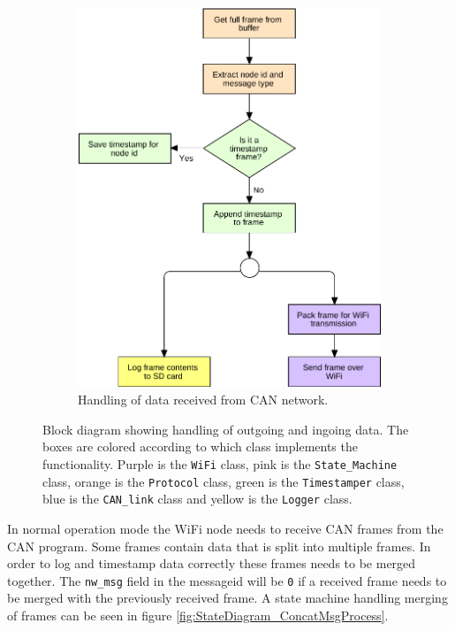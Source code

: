 \begin{figure}[!h]
\begin{subfigure}[b]{0.52\textwidth}
\includegraphics[width=1\textwidth]{graphics/FlowChart_CANFrameProcess}
\caption{Handling of data received from CAN network.}
\label{fig:FlowChart_CANFrameProcess}
\end{subfigure}
\caption[Block diagram showing handling of outgoing and ingoing data.]{Block diagram showing handling of outgoing and ingoing data. The boxes are colored according to which class implements the functionality. Purple is the \texttt{WiFi} class, pink is the \texttt{State\_Machine} class, orange is the \texttt{Protocol} class, green is the \texttt{Timestamper} class, blue is the \texttt{CAN\_link} class and yellow is the \texttt{Logger} class.}
\label{fig:wifi_flow}
\end{figure}

In normal operation mode the WiFi node needs to receive CAN frames from the CAN program. 
Some frames contain data that is split into multiple frames.
In order to log and timestamp data correctly these frames needs to be merged together.
The \texttt{nw\_msg} field in the messageid will be \texttt{0} if a received frame needs to be merged with the previously received frame.
A state machine handling merging of frames can be seen in figure \ref{fig:StateDiagram_ConcatMsgProcess}.

